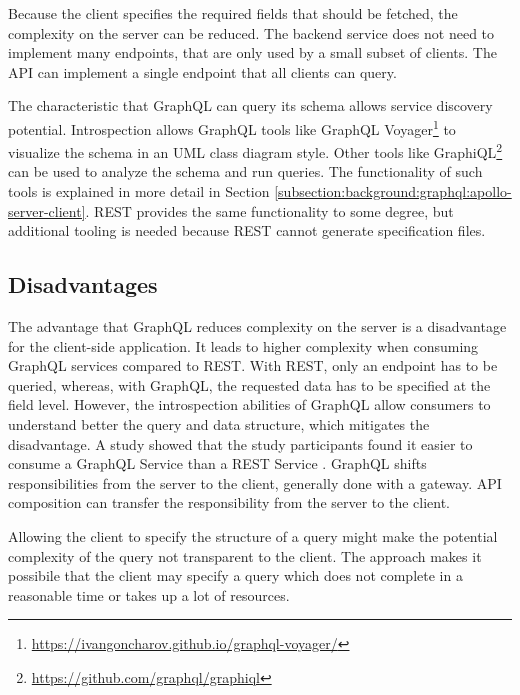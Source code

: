 \bigskip

\noindent Because the client specifies the required fields that should be fetched, the complexity on the server can be reduced. The backend service does not need to implement many endpoints, that are only used by a small subset of clients. The \ac{API} can implement a single endpoint that all clients can query. \cite{book:2018:richardson:background:bff:microservices-patterns}

\bigskip

\noindent The characteristic that GraphQL can query its schema allows service discovery potential. Introspection allows GraphQL tools like GraphQL Voyager\footnote{\url{https://ivangoncharov.github.io/graphql-voyager/}} to visualize the schema in an \ac{UML} class diagram style. Other tools like GraphiQL\footnote{\url{https://github.com/graphql/graphiql}} can be used to analyze the schema and run queries. The functionality of such tools is explained in more detail in Section \ref{subsection:background:graphql:apollo-server-client}. \ac{REST} provides the same functionality to some degree, but additional tooling is needed because \ac{REST} cannot generate specification files.

\subsection{Disadvantages}\label{subsection:background:graphql:graphql-disadvantages}

\noindent The advantage that GraphQL reduces complexity on the server is a disadvantage for the client-side application. It leads to higher complexity when consuming GraphQL services compared to \ac{REST}. With \ac{REST}, only an endpoint has to be queried, whereas, with GraphQL, the requested data has to be specified at the field level. However, the introspection abilities of GraphQL allow consumers to understand better the query and data structure, which mitigates the disadvantage. A study \cite{inproceedings:2020:brito:background:graphql:rest-vs-graphql} showed that the study participants found it easier to consume a GraphQL Service than a \ac{REST} Service \cite{inproceedings:2017:de-pauda:background:graphql:handling-anti-patterns}. GraphQL shifts responsibilities from the server to the client, generally done with a gateway. \ac{API} composition can transfer the responsibility from the server to the client.

\bigskip

\noindent Allowing the client to specify the structure of a query might make the potential complexity of the query not transparent to the client. The approach makes it possibile that the client may specify a query which does not complete in a reasonable time or takes up a lot of resources. \cite{book:2018:richardson:background:bff:microservices-patterns}




